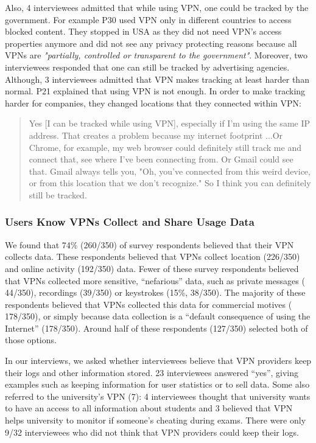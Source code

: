 Also, 4 interviewees admitted that while using VPN, one could be tracked by
the government. For example P30 used VPN only in different countries to access
blocked content. They stopped in USA as they did not need VPN's access
properties anymore and did not see any privacy protecting reasons because all VPNs are \textit{"partially, controlled
or transparent to the government"}. Moreover, two interviewees responded that one can still be tracked by
 advertising agencies. Although, 3 interviewees admitted that VPN makes
 tracking at least harder than normal. P21 explained that using VPN is not enough. In order to make tracking harder
for companies, they changed locations that they connected within VPN:
\begin{quote}Yes [I can be tracked while using VPN], especially if I'm using
the same IP address. That creates a problem because my internet footprint ...Or Chrome, for example, my web browser could definitely still track me
and connect that, see where I've been connecting from. Or Gmail could see
that. Gmail always tells you, "Oh, you've connected from this weird device, or
from this location that we don't recognize." So I think you can definitely
still be tracked.\end{quote}

\subsubsection{Users Know VPNs Collect and Share Usage Data}

We found that 74\% (260/350) of survey respondents believed that their VPN
collects data. These respondents believed that VPNs collect
location (226/350) and online activity (192/350) data. Fewer of these survey
respondents believed that VPNs collected more sensitive, “nefarious” data,
such as private messages ( 44/350), recordings (39/350) or
keystrokes (15\%, 38/350). The majority of these respondents believed that
VPNs collected this data for commercial motives ( 178/350), or simply
because data collection is a “default consequence of using the Internet”
(178/350). Around half of these respondents (127/350) selected
both of those options.

In our interviews, we asked whether
interviewees believe that VPN providers keep their logs and other information stored.
23 interviewees answered “yes”, giving examples such as keeping information
for user statistics or to sell data. Some also referred to the
university’s VPN (7): 4 interviewees thought that university wants to have an
access to all information about students and 3 believed that VPN helps university to monitor
if someone’s cheating during exams. There were only 9/32 interviewees who did not
think that VPN providers could keep their logs.



